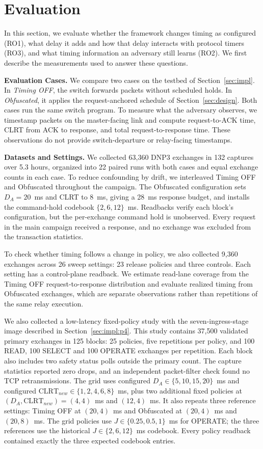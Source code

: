 \section{Evaluation}
\label{sec:eval}

In this section, we evaluate whether the framework changes timing as configured (RO1), what delay
it adds and how that delay interacts with protocol timers (RO3), and what timing information an
adversary still learns (RO2). We first describe the measurements used to answer these questions.

\textbf{Evaluation Cases.} We compare two cases on the testbed of Section~\ref{sec:impl}. In
\emph{Timing OFF}, the switch forwards packets without scheduled holds. In \emph{Obfuscated}, it
applies the request-anchored schedule of Section~\ref{sec:design}. Both cases run the same switch program. To measure what the adversary observes, we timestamp
packets on the master-facing link and compute request-to-ACK time, CLRT from ACK to response, and
total request-to-response time.
These observations do not provide switch-departure or relay-facing timestamps.

\textbf{Datasets and Settings.} We collected 63{,}360 DNP3 exchanges in 132 captures over 5.3 hours, organized into 22 paired runs
with both cases and equal exchange counts in each case. To reduce confounding by drift, we
interleaved Timing OFF and Obfuscated throughout the campaign. The Obfuscated configuration sets
$D_A=20$~ms and CLRT to 8~ms, giving a 28~ms response budget, and installs the command-hold codebook
$\{2,6,12\}$~ms. Readbacks verify each block's configuration, but the per-exchange command hold is
unobserved. Every request in the main campaign received a response, and no exchange was excluded
from the transaction statistics.

To check whether timing follows a change in policy, we also collected 9{,}360 exchanges across
26 sweep settings: 23 release policies and three controls. Each setting has a control-plane readback. We estimate read-lane coverage from the Timing OFF
request-to-response distribution and evaluate realized timing from Obfuscated exchanges, which are
separate observations rather than repetitions of the same relay execution.

We also collected a low-latency fixed-policy study with the seven-ingress-stage image described
in Section~\ref{sec:impl:p4}. This study contains 37{,}500 validated primary exchanges in 125 blocks: 25
policies, five repetitions per policy, and 100 READ, 100 SELECT and 100 OPERATE exchanges per
repetition. Each block also includes two safety status polls outside the primary count. The capture statistics reported zero drops, and an independent packet-filter check found no TCP
retransmissions. The grid uses configured $D_A \in \{5,10,15,20\}$~ms and configured
$\mathrm{CLRT}_{new} \in \{1,2,4,6,8\}$~ms, plus two additional fixed policies at
$(D_A,\mathrm{CLRT}_{new})=(4,4)$~ms and $(12,4)$~ms. It also repeats three reference settings:
Timing OFF at $(20,4)$~ms and Obfuscated at $(20,4)$~ms and $(20,8)$~ms. The grid policies use
$J \in \{0.25,0.5,1\}$~ms for OPERATE; the three references use the historical
$J \in \{2,6,12\}$~ms codebook. Every policy readback contained exactly the three expected
codebook entries.

